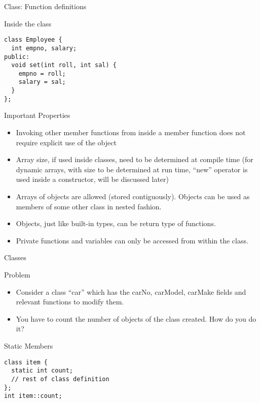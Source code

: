 \documentclass{beamer}
\begin{document}
\begin{frame}[fragile]{Class: Function definitions}
  \begin{block}{Inside the class}\pause
    \begin{lstlisting}
class Employee {
  int empno, salary;
public:
  void set(int roll, int sal) {
    empno = roll;
    salary = sal;
  }
};
    \end{lstlisting}
  \end{block}
\end{frame}

\begin{frame}[fragile]{Important Properties}
  \begin{itemize}
    \item Invoking other member functions from inside a member function does not require explicit use of the object\pause
    \item Array size, if used inside classes, need to be determined at compile time (for dynamic arrays, with size to be determined at run time, ``new'' operator is used inside a constructor, will be discussed later)\pause
    \item Arrays of objects are allowed (stored contiguously). Objects can be used as members of some other class in nested fashion.\pause
    \item Objects, just like built-in types, can be return type of functions.\pause
    \item Private functions and variables can only be accessed from within the class.
  \end{itemize}
\end{frame}

\begin{frame}[fragile]{Classes}
  \begin{block}{Problem}\pause
    \begin{itemize}
    \item Consider a class ``car'' which has the carNo, carModel, carMake fields and relevant functions to modify them.\pause
    \item You have to count the number of objects of the class created. How do you do it?
    \end{itemize}
  \end{block}
\end{frame}

\begin{frame}[fragile]{Static Members}
  \begin{lstlisting}
class item {
  static int count;
  // rest of class definition
};
int item::count;
  \end{lstlisting}
\end{frame}
\end{document}
